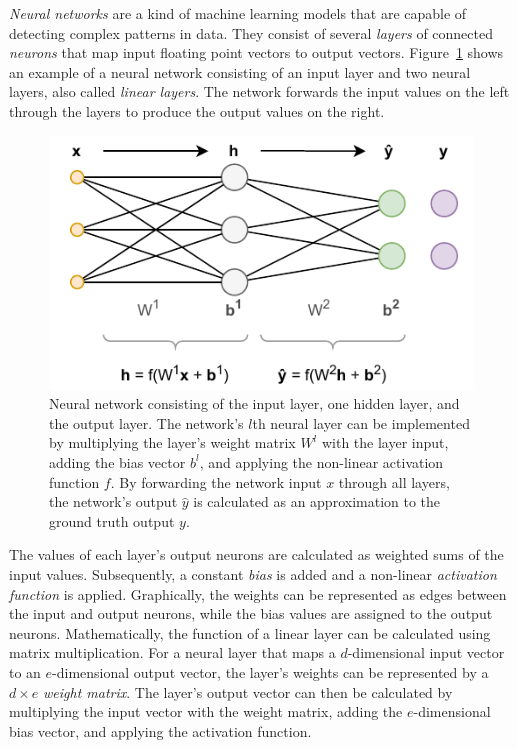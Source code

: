 \emph{Neural networks} are a kind of machine learning models that are capable of detecting complex patterns in data. They consist of several \emph{layers} of connected \emph{neurons} that map input floating point vectors to output vectors. Figure~\ref{fig:2_basics/1_neural_networks/nn} shows an example of a neural network consisting of an input layer and two neural layers, also called \emph{linear layers}. The network forwards the input values on the left through the layers to produce the output values on the right.

\begin{figure}[t]
    \centering
    \includegraphics{2_basics/1_neural_networks/nn}
    \caption{Neural network consisting of the input layer, one hidden layer, and the output layer. The network's $l$th neural layer can be implemented by multiplying the layer's weight matrix $W^l$ with the layer input, adding the bias vector $b^l$, and applying the non-linear activation function $f$. By forwarding the network input $x$ through all layers, the network's output $\hat{y}$ is calculated as an approximation to the ground truth output $y$.}
    \label{fig:2_basics/1_neural_networks/nn}
\end{figure}

The values of each layer's output neurons are calculated as weighted sums of the input values. Subsequently, a constant \emph{bias} is added and a non-linear \emph{activation function} is applied. Graphically, the weights can be represented as edges between the input and output neurons, while the bias values are assigned to the output neurons. Mathematically, the function of a linear layer can be calculated using matrix multiplication. For a neural layer that maps a $d$-dimensional input vector to an $e$-dimensional output vector, the layer's weights can be represented by a $d \times e$ \emph{weight matrix}. The layer's output vector can then be calculated by multiplying the input vector with the weight matrix, adding the $e$-dimensional bias vector, and applying the activation function.

